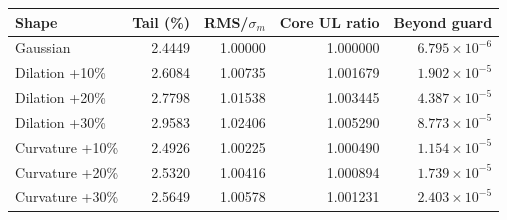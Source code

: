 \begin{tabular}{lrrrr}
\toprule
Shape & Tail (\%) & RMS/$\sigma_m$ & Core UL ratio & Beyond guard \\
\midrule
Gaussian & 2.4449 & 1.00000 & 1.000000 & $6.795\times10^{-6}$ \\
Dilation +10\% & 2.6084 & 1.00735 & 1.001679 & $1.902\times10^{-5}$ \\
Dilation +20\% & 2.7798 & 1.01538 & 1.003445 & $4.387\times10^{-5}$ \\
Dilation +30\% & 2.9583 & 1.02406 & 1.005290 & $8.773\times10^{-5}$ \\
Curvature +10\% & 2.4926 & 1.00225 & 1.000490 & $1.154\times10^{-5}$ \\
Curvature +20\% & 2.5320 & 1.00416 & 1.000894 & $1.739\times10^{-5}$ \\
Curvature +30\% & 2.5649 & 1.00578 & 1.001231 & $2.403\times10^{-5}$ \\
\bottomrule
\end{tabular}
